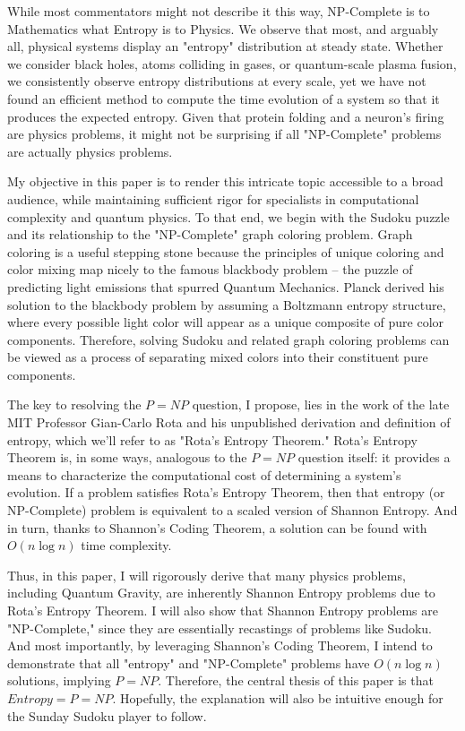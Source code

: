 \documentclass{report}
\begin{document}
    While most commentators might not describe it this way, NP-Complete is to Mathematics what Entropy is to Physics. We observe that most, and arguably all, physical systems display an "entropy" distribution at steady state. Whether we consider black holes, atoms colliding in gases, or quantum-scale plasma fusion, we consistently observe entropy distributions at every scale, yet we have not found an efficient method to compute the time evolution of a system so that it produces the expected entropy. Given that protein folding and a neuron's firing are physics problems, it might not be surprising if all "NP-Complete" problems are actually physics problems.
    
    My objective in this paper is to render this intricate topic accessible to a broad audience, while maintaining sufficient rigor for specialists in computational complexity and quantum physics. To that end, we begin with the Sudoku puzzle and its relationship to the "NP-Complete" graph coloring problem. Graph coloring is a useful stepping stone because the principles of unique coloring and color mixing map nicely to the famous blackbody problem – the puzzle of predicting light emissions that spurred Quantum Mechanics. Planck derived his solution to the blackbody problem by assuming a Boltzmann entropy structure, where every possible light color will appear as a unique composite of pure color components. Therefore, solving Sudoku and related graph coloring problems can be viewed as a process of separating mixed colors into their constituent pure components.
    
   The key to resolving the \(P=NP\) question, I propose, lies in the work of the late MIT Professor Gian-Carlo Rota and his unpublished derivation and definition of entropy, which we'll refer to as "Rota's Entropy Theorem." Rota's Entropy Theorem is, in some ways, analogous to the \(P=NP\) question itself: it provides a means to characterize the computational cost of determining a system's evolution. If a problem satisfies Rota's Entropy Theorem, then that entropy (or NP-Complete) problem is equivalent to a scaled version of Shannon Entropy. And in turn, thanks to Shannon's Coding Theorem, a solution can be found with \(O(n \log n)\) time complexity.
    
    Thus, in this paper, I will rigorously derive that many physics problems, including Quantum Gravity, are inherently Shannon Entropy problems due to Rota's Entropy Theorem. I will also show that Shannon Entropy problems are "NP-Complete," since they are essentially recastings of problems like Sudoku. And most importantly, by leveraging Shannon's Coding Theorem, I intend to demonstrate that all "entropy" and "NP-Complete" problems have \(O(n \log n)\) solutions, implying \(P=NP\). Therefore, the central thesis of this paper is that \(Entropy=P=NP\). Hopefully, the explanation will also be intuitive enough for the Sunday Sudoku player to follow.
    
\end{document}
